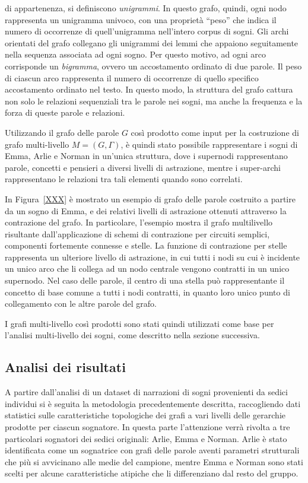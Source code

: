 \begin{enumerate}
          di appartenenza, si definiscono \textit{unigrammi}. In questo grafo, quindi, ogni nodo rappresenta
          un unigramma univoco, con una proprietà ``peso'' che indica il numero di occorrenze di quell'unigramma
          nell'intero corpus di sogni.
          Gli archi orientati del grafo collegano gli unigrammi dei lemmi che appaiono seguitamente nella
          sequenza associata ad ogni sogno.
          Per questo motivo, ad ogni arco corrisponde un \textit{bigramma}, ovvero un accostamento ordinato di due parole.
          Il peso di ciascun arco rappresenta il numero di occorrenze di quello specifico accostamento ordinato nel testo.
          In questo modo, la struttura del grafo cattura non solo le relazioni sequenziali tra le parole nei sogni,
          ma anche la frequenza e la forza di queste parole e relazioni.
\end{enumerate}

Utilizzando il grafo delle parole $G$ così prodotto come input per la costruzione di grafo multi-livello
$M = (G, \Gamma)$, è quindi stato possibile rappresentare i sogni di Emma, Arlie e Norman in un'unica struttura,
dove i supernodi rappresentano parole, concetti e pensieri a diversi livelli di astrazione, mentre i super-archi
rappresentano le relazioni tra tali elementi quando sono correlati.


In Figura~\ref{XXX} è mostrato un esempio di grafo delle parole costruito a partire da un sogno di Emma, e dei
relativi livelli di astrazione ottenuti attraverso la contrazione del grafo.
In particolare, l'esempio mostra il grafo multilivello risultante dall'applicazione di schemi di contrazione per
circuiti semplici, componenti fortemente connesse e stelle.
La funzione di contrazione per stelle rappresenta un ulteriore livello di astrazione, in cui tutti i nodi su cui è
incidente un unico arco che li collega ad un nodo centrale vengono contratti in un unico supernodo.
Nel caso delle parole, il centro di una stella può rappresentante il concetto di base comune a tutti i nodi contratti,
in quanto loro unico punto di collegamento con le altre parole del grafo.

I grafi multi-livello così prodotti sono stati quindi utilizzati come base per l'analisi multi-livello dei sogni,
come descritto nella sezione successiva.

\subsection{Analisi dei risultati}
A partire dall'analisi di un dataset di narrazioni di sogni provenienti da sedici individui si è seguita la
metodologia precedentemente descritta, raccogliendo dati statistici sulle caratteristiche topologiche
dei grafi a vari livelli delle gerarchie prodotte per ciascun sognatore.
In questa parte l'attenzione verrà rivolta a tre particolari sognatori dei sedici originali: Arlie, Emma e Norman.
Arlie è stato identificata come un sognatrice con grafi delle parole aventi parametri strutturali che più si
avvicinano alle medie del campione, mentre Emma e Norman sono stati scelti per alcune caratteristiche atipiche
che li differenziano dal resto del gruppo.

